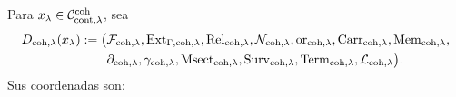 Para \(x_\lambda\in\mathcal C_{{\rm cont},\lambda}^{\rm coh}\), sea
\begin{equation}\label{eq:pdfv2-coh-d-package}
 \begin{aligned}
 D_{{\rm coh},\lambda}(x_\lambda):=\bigl(&
 \mathcal F_{{\rm coh},\lambda},
 \operatorname{Ext}_{\Gamma,{\rm coh},\lambda},
 \operatorname{Rel}_{{\rm coh},\lambda},
 \mathcal N_{{\rm coh},\lambda},
 \operatorname{or}_{{\rm coh},\lambda},
 \operatorname{Carr}_{{\rm coh},\lambda},
 \operatorname{Mem}_{{\rm coh},\lambda},\\
 &\partial_{{\rm coh},\lambda},
 \gamma_{{\rm coh},\lambda},
 \operatorname{Msect}_{{\rm coh},\lambda},
 \operatorname{Surv}_{{\rm coh},\lambda},
 \operatorname{Term}_{{\rm coh},\lambda},
 \mathcal L_{{\rm coh},\lambda}\bigr).
 \end{aligned}
\end{equation}
Sus coordenadas son:
